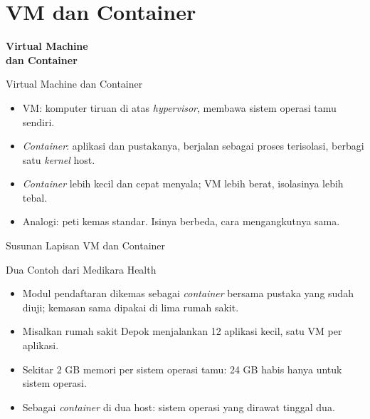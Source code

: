 \documentclass[aspectratio=169, table, 12pt]{beamer}
\begin{document}
\section{VM dan Container}

\begin{frame}{\hfill}
  \centering
  \Huge{\textbf{Virtual Machine\\dan Container}}
\end{frame}

\begin{frame}{{\Large Virtual Machine dan Container}}
  \vspace{6pt}
  \begin{itemize}
    \item VM: komputer tiruan di atas \textit{hypervisor}, membawa sistem
          operasi tamu sendiri.
    \item \textit{Container}: aplikasi dan pustakanya, berjalan sebagai proses
          terisolasi, berbagi satu \textit{kernel} host.
    \item \textit{Container} lebih kecil dan cepat menyala; VM lebih berat,
          isolasinya lebih tebal.
    \item Analogi: peti kemas standar. Isinya berbeda, cara mengangkutnya
          sama.
  \end{itemize}
\end{frame}

\begin{frame}{{\Large Susunan Lapisan VM dan Container}}
  \centering
\end{frame}

\begin{frame}{{\Large Dua Contoh dari Medikara Health}}
  \vspace{6pt}
  \begin{itemize}
    \item Modul pendaftaran dikemas sebagai \textit{container} bersama pustaka
          yang sudah diuji; kemasan sama dipakai di lima rumah sakit.
    \item Misalkan rumah sakit Depok menjalankan 12 aplikasi kecil, satu VM
          per aplikasi.
    \item Sekitar 2 GB memori per sistem operasi tamu: 24 GB habis hanya
          untuk sistem operasi.
    \item Sebagai \textit{container} di dua host: sistem operasi yang dirawat
          tinggal dua.
  \end{itemize}
\end{frame}
\end{document}
